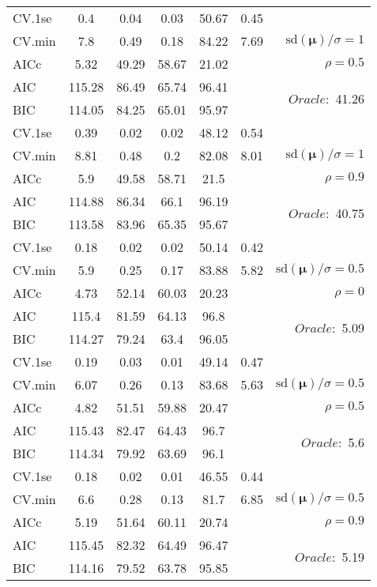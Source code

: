 \begin{table}
\begin{center}
\begin{tabular}{l*{5}{c}|r}
 \hline 
CV.1se & 0.4 & 0.04 & 0.03 & 50.67 & 0.45 & \\
CV.min & 7.8 & 0.49 & 0.18 & 84.22 & 7.69 &  $\mathrm{sd}(\mathbf{\mu})/\sigma=1$ \\
AICc & 5.32 & 49.29 & 58.67 & 21.02 & & $\rho=0.5$ \\
AIC & 115.28 & 86.49 & 65.74 & 96.41 & &  \multirow{2}{*}{$Oracle: $ 41.26} \\
BIC & 114.05 & 84.25 & 65.01 & 95.97 & &  \\
 \hline 
CV.1se & 0.39 & 0.02 & 0.02 & 48.12 & 0.54 & \\
CV.min & 8.81 & 0.48 & 0.2 & 82.08 & 8.01 &  $\mathrm{sd}(\mathbf{\mu})/\sigma=1$ \\
AICc & 5.9 & 49.58 & 58.71 & 21.5 & & $\rho=0.9$ \\
AIC & 114.88 & 86.34 & 66.1 & 96.19 & &  \multirow{2}{*}{$Oracle: $ 40.75} \\
BIC & 113.58 & 83.96 & 65.35 & 95.67 & &  \\
 \hline 
CV.1se & 0.18 & 0.02 & 0.02 & 50.14 & 0.42 & \\
CV.min & 5.9 & 0.25 & 0.17 & 83.88 & 5.82 &  $\mathrm{sd}(\mathbf{\mu})/\sigma=0.5$ \\
AICc & 4.73 & 52.14 & 60.03 & 20.23 & & $\rho=0$ \\
AIC & 115.4 & 81.59 & 64.13 & 96.8 & &  \multirow{2}{*}{$Oracle: $ 5.09} \\
BIC & 114.27 & 79.24 & 63.4 & 96.05 & &  \\
 \hline 
CV.1se & 0.19 & 0.03 & 0.01 & 49.14 & 0.47 & \\
CV.min & 6.07 & 0.26 & 0.13 & 83.68 & 5.63 &  $\mathrm{sd}(\mathbf{\mu})/\sigma=0.5$ \\
AICc & 4.82 & 51.51 & 59.88 & 20.47 & & $\rho=0.5$ \\
AIC & 115.43 & 82.47 & 64.43 & 96.7 & &  \multirow{2}{*}{$Oracle: $ 5.6} \\
BIC & 114.34 & 79.92 & 63.69 & 96.1 & &  \\
 \hline 
CV.1se & 0.18 & 0.02 & 0.01 & 46.55 & 0.44 & \\
CV.min & 6.6 & 0.28 & 0.13 & 81.7 & 6.85 &  $\mathrm{sd}(\mathbf{\mu})/\sigma=0.5$ \\
AICc & 5.19 & 51.64 & 60.11 & 20.74 & & $\rho=0.9$ \\
AIC & 115.45 & 82.32 & 64.49 & 96.47 & &  \multirow{2}{*}{$Oracle: $ 5.19} \\
BIC & 114.16 & 79.52 & 63.78 & 95.85 & &  \\
 \hline 
\end{tabular}
\end{center}
\vspace{-1cm}
\end{table}




